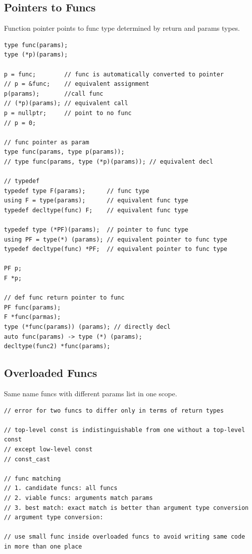 \documentclass{blog}
\begin{document}
\subsection{Pointers to Funcs}
\begin{definition}
    Function pointer points to func type determined by return and params types.
    \begin{verbatim}
type func(params);
type (*p)(params);

p = func;        // func is automatically converted to pointer
// p = &func;    // equivalent assignment
p(params);       //call func
// (*p)(params); // equivalent call
p = nullptr;     // point to no func
// p = 0;

// func pointer as param
type func(params, type p(params));
// type func(params, type (*p)(params)); // equivalent decl

// typedef
typedef type F(params);      // func type
using F = type(params);      // equivalent func type
typedef decltype(func) F;    // equivalent func type

typedef type (*PF)(params);  // pointer to func type
using PF = type(*) (params); // equivalent pointer to func type
typedef decltype(func) *PF;  // equivalent pointer to func type

PF p;
F *p;

// def func return pointer to func
PF func(params);
F *func(parmas);
type (*func(params)) (params); // directly decl
auto func(params) -> type (*) (params);
decltype(func2) *func(params);
\end{verbatim}
\end{definition}

\subsection{Overloaded Funcs}
\begin{definition}[overload]
    Same name funcs with different params list in one scope.
    \begin{verbatim}
// error for two funcs to differ only in terms of return types

// top-level const is indistinguishable from one without a top-level const
// except low-level const
// const_cast

// func matching
// 1. candidate funcs: all funcs
// 2. viable funcs: arguments match params
// 3. best match: exact match is better than argument type conversion
// argument type conversion:

// use small func inside overloaded funcs to avoid writing same code in more than one place
\end{verbatim}
\end{definition}
\end{document}
